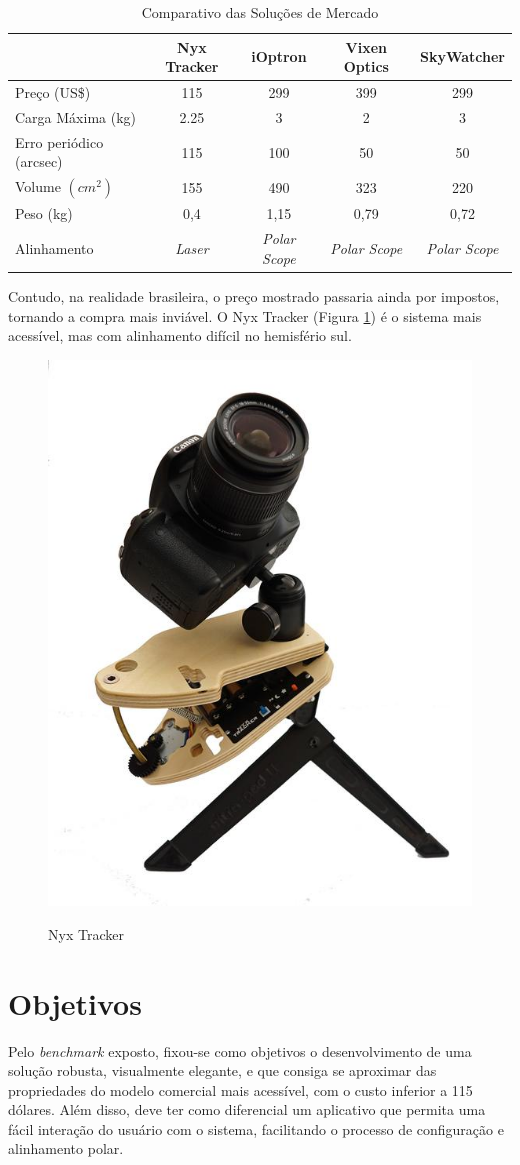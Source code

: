 \begin{table}[htb]
	\caption{Comparativo das Soluções de Mercado}
	\begin{tabular}{l|cccc}
		& Nyx Tracker & iOptron & Vixen Optics & SkyWatcher \\ \hline
		Preço (US\$) & 115 & 299 & 399 & 299 \\\hline
		Carga Máxima (kg) & 2.25 & 3 & 2 & 3 \\\hline
		Erro periódico (arcsec) & 115 & 100 & 50 & 50 \\\hline
		Volume $ (cm^2) $ & 155 & 490 & 323 & 220 \\\hline
		Peso (kg) & 0,4 & 1,15 & 0,79 & 0,72 \\\hline
		Alinhamento & \textit{Laser} & \textit{Polar Scope} & \textit{Polar Scope} & \textit{Polar Scope} \\
	\end{tabular}
	\label{tabela_benchmark}
\end{table}

Contudo, na realidade brasileira, o preço mostrado passaria ainda por impostos, tornando a compra mais inviável. O Nyx Tracker (Figura \ref{fig:nyxtracker}) é o sistema mais acessível, mas com alinhamento difícil no hemisfério sul.

\begin{figure}[h]
	\centering
	\caption{Nyx Tracker}
	\includegraphics[width=0.3\linewidth]{figuras/nyxtracker}
	\label{fig:nyxtracker}
\end{figure}


\section{Objetivos}

Pelo \textit{benchmark} exposto, fixou-se como objetivos o desenvolvimento de uma solução robusta, visualmente elegante, e que consiga se aproximar das propriedades do modelo comercial mais acessível, com o custo inferior a 115 dólares. Além disso, deve ter como diferencial um aplicativo que permita uma fácil interação do usuário com o sistema, facilitando o processo de configuração e alinhamento polar.


